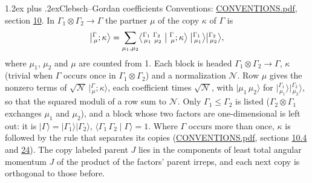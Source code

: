 \documentclass[10pt,a4paper]{article}
\makeatletter
\renewcommand\section{\@startsection{section}{1}{\z@}{-3ex plus -1ex minus -.2ex}%
  {1.2ex plus .2ex}{\normalfont\large\sffamily\bfseries\color{parttitle}}}
\numberwithin{equation}{section}
\newcommand{\irrprod}{\otimes}
\newcommand{\mult}{\kappa}
\newcommand{\intx}{\mu}
\newcommand{\cgnorm}{\mathcal{N}}
\newcommand{\cgket}[3]{\bigl\lvert{}^{#1}_{\,#2};#3\bigr\rangle}
\newcommand{\irket}[2]{\bigl\lvert{}^{#1}_{\,#2}\bigr\rangle}
\newcommand{\prodket}[2]{\lvert {#1}\,{#2}\rangle}
\newcommand{\ket}[1]{\lvert #1\rangle}
\newcommand{\cgck}[7]{\bigl\langle{}^{#1}_{\,#2}\,{}^{#3}_{\,#4}\bigm\vert{}^{#5}_{\,#6};#7\bigr\rangle}
\newcommand{\cgcone}[3]{\langle #1\,#2\mid #3\rangle}
\makeatother
\begin{document}
\section{Clebsch--Gordan coefficients}\label{s:clebsch_gordan}
Conventions: \href{../../CONVENTIONS.pdf}{CONVENTIONS.pdf}, section \href{../../../rotation/CONVENTIONS.pdf\#conv.10}{10}.
\leavevmode\label{n:index.copy}\label{n:index.cg}\label{n:vector.ket.coupled}\label{n:function.cg.copy}In $\Gamma_1\irrprod\Gamma_2\to\Gamma$ the partner $\intx$ of the copy $\mult$ of $\Gamma$ is
\begin{equation}\label{e:cg}\cgket{\Gamma}{\intx}{\mult} = \sum_{\intx_1,\intx_2}\cgck{\Gamma_1}{\intx_1}{\Gamma_2}{\intx_2}{\Gamma}{\intx}{\mult}\;\irket{\Gamma_1}{\intx_1}\irket{\Gamma_2}{\intx_2},\end{equation}
where $\intx_1$, $\intx_2$ and $\intx$ are counted from 1. \label{n:index.normalisation}Each block is headed $\Gamma_1\irrprod\Gamma_2\to\Gamma$, $\mult$ (trivial when $\Gamma$ occurs once in $\Gamma_1\irrprod\Gamma_2$) and a normalization $\cgnorm$. \label{n:vector.ket.product}Row $\intx$ gives the nonzero terms of $\sqrt{\cgnorm}\,\cgket{\Gamma}{\intx}{\mult}$, each coefficient times $\sqrt{\cgnorm}$, with $\prodket{\intx_1}{\intx_2}$ for $\irket{\Gamma_1}{\intx_1}\irket{\Gamma_2}{\intx_2}$, so that the squared moduli of a row sum to $\cgnorm$. \label{n:vector.ket.one}\label{n:function.cg.one}Only $\Gamma_1 \le \Gamma_2$ is listed ($\Gamma_2\irrprod\Gamma_1$ exchanges $\intx_1$ and $\intx_2$), and a block whose two factors are one-dimensional is left out: it is $\ket{\Gamma} = \ket{\Gamma_1}\ket{\Gamma_2}$, $\cgcone{\Gamma_1}{\Gamma_2}{\Gamma} = 1$.
Where $\Gamma$ occurs more than once, $\mult$ is followed by the rule that separates its copies (\href{../../CONVENTIONS.pdf}{CONVENTIONS.pdf}, sections \href{../../../rotation/CONVENTIONS.pdf\#conv.10.4}{10.4} and \href{../../CONVENTIONS.pdf\#conv.24}{24}). \label{n:abbreviation.parent.su2}The copy labeled parent $J$ lies in the components of least total angular momentum $J$ of the product of the factors' parent irreps, and each next copy is orthogonal to those before.
\end{document}

